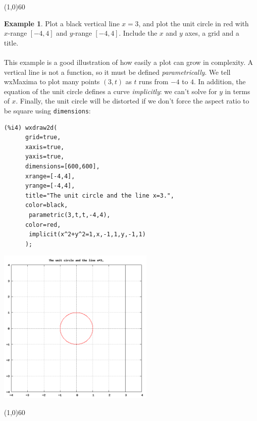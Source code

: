 \documentclass[10.5pt,twoside]{report}
\theoremstyle{definition}
\newtheorem{exmp}{Example}[section]
\begin{document}
\line(1,0){60}
\linethickness{0.5mm}



\begin{exmp}  Plot a black vertical line $x=3$, and plot the unit circle in red with $x$-range $[-4,4]$ and $y$-range $[-4,4]$.  Include the $x$ and $y$ axes, a grid and a title.  \\
${}$\\

This example is a good illustration of how easily a plot can grow in complexity.  A vertical line is not a function, so it must be defined \textit{parametrically}.  We tell wxMaxima to plot many points $(3,t)$ as $t$ runs from $-4$ to $4$.  In addition, the equation of the unit circle defines a curve \textit{implicitly}:  we can't solve for $y$ in terms of $x$.  Finally, the unit circle will be distorted if we don't force the aspect ratio to be square using \verb|dimensions|:

\begin{verbatim}
(%i4) wxdraw2d(
      grid=true,
      xaxis=true,
      yaxis=true,
      dimensions=[600,600],
      xrange=[-4,4],
      yrange=[-4,4],
      title="The unit circle and the line x=3.",
      color=black,
       parametric(3,t,t,-4,4),
      color=red,
       implicit(x^2+y^2=1,x,-1,1,y,-1,1)
      ); 
\end{verbatim}

\includegraphics[width=3in]{example_0_3_3_1}

\end{exmp}

\line(1,0){60}
\linethickness{0.5mm}
\end{document}
